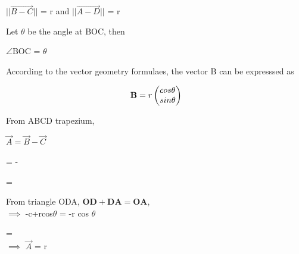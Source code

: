 \documentclass[journal,10pt,twocolumn]{article}
\begin{document}
\begin{flushleft}
\vspace{0.25cm}
$|| \vec{B-C} || $ = r and $|| \vec{A-D} || $ = r\\
\vspace{0.25cm}
\begin{flushleft}
Let $\theta$ be the angle at BOC, then\\
\end{flushleft}
\vspace{0.25cm}
$\angle$BOC = $\theta$\\
\vspace{0.25cm}
\begin{flushleft}
According to the vector geometry formulaes, the vector B can be expresssed as\\
\end{flushleft}
\vspace{0.25cm}
\begin{equation}
   \mathbf{B}= r \begin{pmatrix}cos\theta \\ sin\theta\end{pmatrix}
\end{equation}

\vspace{0.35cm}
\begin{flushleft}
From ABCD trapezium, \\
\end{flushleft}
\begin{center}
$\vec{A} =\vec{B}-  \vec{C}$\\
\end{center}

\center
\vspace{0.4cm}
=  - 
   
\endcenter{}
		= 
	\\
\vspace{0.3cm}
\begin{flushleft}
From triangle ODA,
$\boldsymbol{OD+DA=OA}$, \\
\vspace{0.2cm} 
$\implies$ -c+rcos$\theta$ = -r cos $\theta$\\
\end{flushleft}
\vspace{0.35cm}
	=  \\
\endcenter{}
	$\implies$ $\vec{A}$
	= r \\
\end{flushleft}
\end{document}
